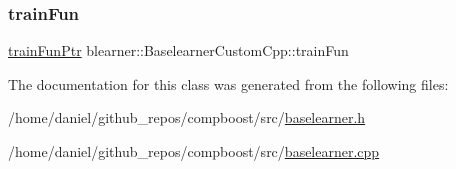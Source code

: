 \mbox{\label{classblearner_1_1_baselearner_custom_cpp_ab04bffb15f84320d325821edb97ef9f5}} 
\subsubsection{\texorpdfstring{train\+Fun}{trainFun}}
{\footnotesize\ttfamily \hyperlink{namespaceblearner_a5e2b38edf05e32681bee136af9ae505d}{train\+Fun\+Ptr} blearner\+::\+Baselearner\+Custom\+Cpp\+::train\+Fun\hspace{0.3cm}{\ttfamily [private]}}



The documentation for this class was generated from the following files\+:\begin{DoxyCompactItemize}
\item 
/home/daniel/github\+\_\+repos/compboost/src/\hyperlink{baselearner_8h}{baselearner.\+h}\item 
/home/daniel/github\+\_\+repos/compboost/src/\hyperlink{baselearner_8cpp}{baselearner.\+cpp}\end{DoxyCompactItemize}

